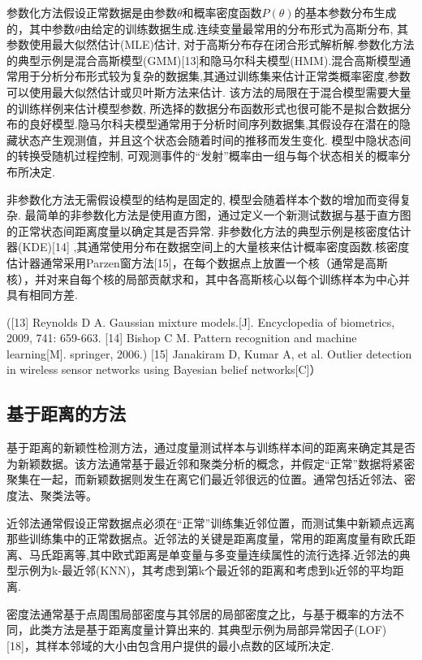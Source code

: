 \documentclass{Style/aas}
\begin{document}
\begin{multicols}{2}
  参数化方法假设正常数据是由参数$\theta$和概率密度函数$P\left( \theta \right) $的基本参数分布生成的，其中参数$\theta$由给定的训练数据生成.连续变量最常用的分布形式为高斯分布, 其参数使用最大似然估计(MLE)估计, 对于高斯分布存在闭合形式解析解.参数化方法的典型示例是混合高斯模型(GMM)[13]和隐马尔科夫模型(HMM).混合高斯模型通常用于分析分布形式较为复杂的数据集,其通过训练集来估计正常类概率密度,参数可以使用最大似然估计或贝叶斯方法来估计. 该方法的局限在于混合模型需要大量的训练样例来估计模型参数, 所选择的数据分布函数形式也很可能不是拟合数据分布的良好模型.隐马尔科夫模型通常用于分析时间序列数据集,其假设存在潜在的隐藏状态产生观测值，并且这个状态会随着时间的推移而发生变化. 模型中隐状态间的转换受随机过程控制, 可观测事件的“发射”概率由一组与每个状态相关的概率分布所决定.

  非参数化方法无需假设模型的结构是固定的, 模型会随着样本个数的增加而变得复杂. 最简单的非参数化方法是使用直方图，通过定义一个新测试数据与基于直方图的正常状态间距离度量以确定其是否异常. 非参数化方法的典型示例是核密度估计器(KDE)[14] ,其通常使用分布在数据空间上的大量核来估计概率密度函数.核密度估计器通常采用Parzen窗方法[15]，在每个数据点上放置一个核（通常是高斯核），并对来自每个核的局部贡献求和，其中各高斯核心以每个训练样本为中心并具有相同方差.

  ([13] Reynolds D A. Gaussian mixture models.[J]. Encyclopedia of biometrics, 2009, 741: 659-663.
  [14] Bishop C M. Pattern recognition and machine learning[M]. springer, 2006.)
  [15] Janakiram D, Kumar A, et al. Outlier detection in wireless sensor networks using Bayesian belief networks[C]）

  \subsection{基于距离的方法}
  基于距离的新颖性检测方法，通过度量测试样本与训练样本间的距离来确定其是否为新颖数据。该方法通常基于最近邻和聚类分析的概念，并假定“正常”数据将紧密聚集在一起，而新颖数据则发生在离它们最近邻很远的位置。通常包括近邻法、密度法、聚类法等。

  近邻法通常假设正常数据点必须在“正常”训练集近邻位置，而测试集中新颖点远离那些训练集中的正常数据点。近邻法的关键是距离度量，常用的距离度量有欧氏距离、马氏距离等,其中欧式距离是单变量与多变量连续属性的流行选择.近邻法的典型示例为k-最近邻(KNN)，其考虑到第k个最近邻的距离和考虑到k近邻的平均距离.

  密度法通常基于点周围局部密度与其邻居的局部密度之比，与基于概率的方法不同，此类方法是基于距离度量计算出来的. 其典型示例为局部异常因子(LOF) [18]，其样本邻域的大小由包含用户提供的最小点数的区域所决定.


\end{multicols}
\end{document}
